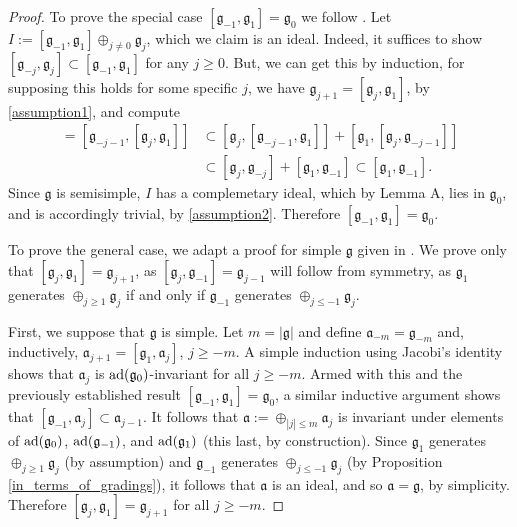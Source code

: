 \documentclass[leqno,12pt]{amsart} %
\begin{document}
\begin{proof}
  To prove the special case $[{\mathfrak g}_{-1}, {\mathfrak g}_1]={\mathfrak g}_0$ we
  follow \cite[p.~214]{Cap_Slovak_09}. Let
  $I := [{\mathfrak g}_{-1}, {\mathfrak g}_1]\oplus_{j\ne 0}{\mathfrak g}_j$, which we
  claim is an ideal. Indeed, it suffices to show
  $[{\mathfrak g}_{-j}, {\mathfrak g}_j] \subset [{\mathfrak g}_{-1}, {\mathfrak g}_1]$
  for any $j\ge 0$. But, we can get this by induction, for supposing this holds for some
  specific $j$, we have ${\mathfrak g}_{j+1} = [{\mathfrak g}_j, {\mathfrak g}_1]$, by
  \eqref{assumption1}, and compute
  \begin{align*}
    [{\mathfrak g}_{-j-1}, {\mathfrak g}_{j+1}] =
    [{\mathfrak g}_{-j-1}, [{\mathfrak g}_j, {\mathfrak g}_1]] &\subset
    [{\mathfrak g}_j, [{\mathfrak g}_{-j-1}, {\mathfrak g}_1]] + [{\mathfrak g}_1, [{\mathfrak g}_j, {\mathfrak g}_{-j-1}]]\\
    &\subset [{\mathfrak g}_j, {\mathfrak g}_{-j}] + [{\mathfrak g}_1, {\mathfrak g}_{-1}] \subset
    [{\mathfrak g}_1, {\mathfrak g}_{-1}].
  \end{align*}
  Since ${\mathfrak g} $ is semisimple, $I$ has a complemetary ideal, which by Lemma A,
  lies in ${\mathfrak g}_0$, and is accordingly trivial, by \eqref{assumption2}. Therefore
  $[{\mathfrak g}_{-1}, {\mathfrak g}_1]={\mathfrak g}_0$.

  To prove the general case, we adapt a proof for simple ${\mathfrak g}$ given in
  \cite[Lemma 3.2, p.~437]{Yamaguchi_93}. We prove only that
  $[{\mathfrak g}_j, {\mathfrak g}_1] = {\mathfrak g}_{j+1}$, as
  $[{\mathfrak g}_j, {\mathfrak g}_{-1}]={\mathfrak g}_{j-1}$ will follow from symmetry,
  as ${\mathfrak g}_1$ generates $\oplus_{j\ge 1}{\mathfrak g}_j$ if and only if
  ${\mathfrak g}_{-1}$ generates $\oplus_{j\le -1}{\mathfrak g}_j$.

  First, we suppose that ${\mathfrak g}$ is simple. Let $m = |{\mathfrak g}|$ and define
  ${\mathfrak a}_{-m}={\mathfrak g}_{-m}$ and, inductively,
  ${\mathfrak a}_{j+1} = [{\mathfrak g}_1,{\mathfrak a}_j]$, $j\ge -m$. A simple induction
  using Jacobi's identity shows that ${\mathfrak a}_j$ is
  $\operatorname{ad}({\mathfrak g}_0)$-invariant for all $j \ge -m$. Armed with this and the
  previously established result $[{\mathfrak g}_{-1}, {\mathfrak g}_1]={\mathfrak g}_0$, a
  similar inductive argument shows that
  $[{\mathfrak g}_{-1}, {\mathfrak a}_j] \subset {\mathfrak a}_{j-1}$. It follows that
  ${\mathfrak a}:=\oplus_{|j|\le m}{\mathfrak a}_j$ is invariant under elements of
  $\operatorname{ad}({\mathfrak g}_0)$, $\operatorname{ad}({\mathfrak g}_{-1})$, and
  $\operatorname{ad}({\mathfrak g}_1)$ (this last, by construction). Since ${\mathfrak g}_1$
  generates $\oplus_{j\ge 1}{\mathfrak g}_j$ (by assumption) and ${\mathfrak g}_{-1}$
  generates $\oplus_{j\le -1}{\mathfrak g}_j$ (by Proposition \ref{in_terms_of_gradings}),
  it follows that ${\mathfrak a} $ is an ideal, and so ${\mathfrak a} = {\mathfrak g} $,
  by simplicity. Therefore $[{\mathfrak g}_j, {\mathfrak g}_1]={\mathfrak g}_{j+1}$ for
  all $j\ge -m$.


\end{proof}
\end{document}
